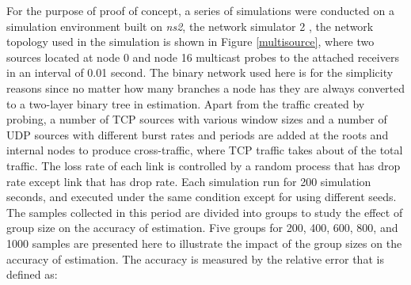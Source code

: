 \documentclass[10pt,twocolumn]{IEEEtran}
\begin{document}
For the purpose of proof of concept, a series of simulations were
conducted on a simulation environment built on {\it ns2}, the network
simulator 2 \cite{NS2}, the network topology used in the simulation is
shown in Figure \ref{multisource}, where two sources located at node 0
and node 16
 multicast probes  to the
attached receivers in an interval of 0.01 second. The binary network
used here is for the simplicity reasons since no matter how many
branches a node has they are always converted to a two-layer binary
tree in estimation. Apart from the traffic created by probing, a
number of TCP sources with various window sizes and a number of UDP
sources with different burst rates and periods are added at the roots
and internal nodes to produce cross-traffic, where TCP traffic takes
about  of the total traffic. The loss rate of each link is
controlled by a random process that has  drop rate except link
 that has  drop rate. Each simulation run for 200 simulation
seconds, and executed under the same condition except for using
different seeds. The samples collected in this period are divided into
groups to study the effect of group size on the accuracy of
estimation. Five groups for 200, 400, 600, 800, and 1000 samples are
presented here  to illustrate the impact of the group sizes on the
accuracy of estimation. The accuracy is measured by the relative error
that is defined as:
\end{document}
